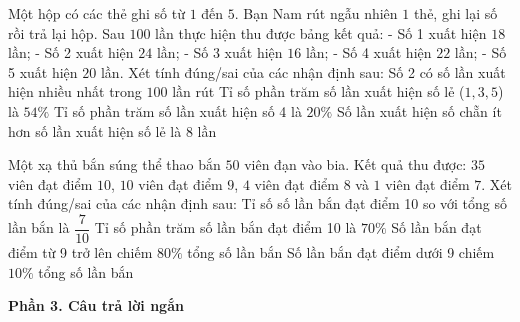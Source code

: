 \begin{ex} %
Một hộp có các thẻ ghi số từ $1$ đến $5$. Bạn Nam rút ngẫu nhiên $1$ thẻ, ghi lại số rồi trả lại hộp. Sau $100$ lần thực hiện thu được bảng kết quả:
- Số 1 xuất hiện $18$ lần;
- Số 2 xuất hiện $24$ lần;
- Số 3 xuất hiện $16$ lần;
- Số 4 xuất hiện $22$ lần;
- Số 5 xuất hiện $20$ lần.
Xét tính đúng/sai của các nhận định sau:
\choiceTF
{\True Số 2 có số lần xuất hiện nhiều nhất trong $100$ lần rút}
{\True Tỉ số phần trăm số lần xuất hiện số lẻ ($1, 3, 5$) là $54\%$}
{Tỉ số phần trăm số lần xuất hiện số 4 là $20\%$}
{\True Số lần xuất hiện số chẵn ít hơn số lần xuất hiện số lẻ là $8$ lần}
\end{ex}

\begin{ex} %
Một xạ thủ bắn súng thể thao bắn $50$ viên đạn vào bia. Kết quả thu được: $35$ viên đạt điểm $10$, $10$ viên đạt điểm $9$, $4$ viên đạt điểm $8$ và $1$ viên đạt điểm $7$. Xét tính đúng/sai của các nhận định sau:
\choiceTF
{\True Tỉ số số lần bắn đạt điểm 10 so với tổng số lần bắn là $\dfrac{7}{10}$}
{\True Tỉ số phần trăm số lần bắn đạt điểm 10 là $70\%$}
{Số lần bắn đạt điểm từ 9 trở lên chiếm $80\%$ tổng số lần bắn}
{\True Số lần bắn đạt điểm dưới 9 chiếm $10\%$ tổng số lần bắn}
\end{ex}

\textbf{Phần 3. Câu trả lời ngắn}

